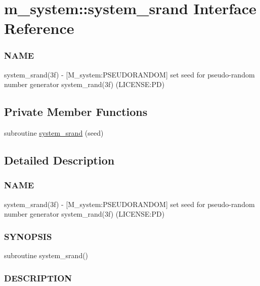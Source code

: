 \hypertarget{interfacem__system_1_1system__srand}{}\section{m\+\_\+system\+:\+:system\+\_\+srand Interface Reference}
\label{interfacem__system_1_1system__srand}


\subsubsection*{N\+A\+ME}

system\+\_\+srand(3f) -\/ \mbox{[}M\+\_\+system\+:P\+S\+E\+U\+D\+O\+R\+A\+N\+D\+OM\mbox{]} set seed for pseudo-\/random number generator system\+\_\+rand(3f) (L\+I\+C\+E\+N\+SE\+:PD)  


\subsection*{Private Member Functions}
\begin{DoxyCompactItemize}
\item 
subroutine \mbox{\hyperlink{interfacem__system_1_1system__srand_ade7bd32973cd799f1362cec842bef377}{system\+\_\+srand}} (seed)
\end{DoxyCompactItemize}


\subsection{Detailed Description}
\subsubsection*{N\+A\+ME}

system\+\_\+srand(3f) -\/ \mbox{[}M\+\_\+system\+:P\+S\+E\+U\+D\+O\+R\+A\+N\+D\+OM\mbox{]} set seed for pseudo-\/random number generator system\+\_\+rand(3f) (L\+I\+C\+E\+N\+SE\+:PD) 

\subsubsection*{S\+Y\+N\+O\+P\+S\+IS}

\begin{DoxyVerb}subroutine system_srand()
\end{DoxyVerb}


\subsubsection*{D\+E\+S\+C\+R\+I\+P\+T\+I\+ON}

